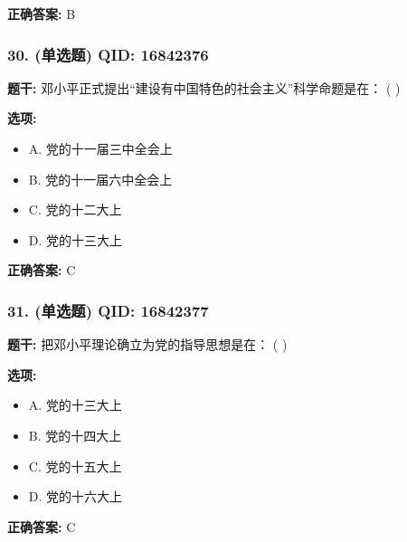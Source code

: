 \documentclass[12pt,UTF8]{ctexart}
\begin{document}
\textbf{正确答案:}
B

\vspace{0.3em}\hrulefill\vspace{0.7em}

\subsubsection*{30. (单选题) \small QID: 16842376}

\textbf{题干:}
邓小平正式提出“建设有中国特色的社会主义”科学命题是在： ( )

\textbf{选项:}
\begin{itemize}[leftmargin=*]

  \item A. 党的十一届三中全会上

  \item B. 党的十一届六中全会上

  \item C. 党的十二大上

  \item D. 党的十三大上

\end{itemize}

\textbf{正确答案:}
C

\vspace{0.3em}\hrulefill\vspace{0.7em}

\subsubsection*{31. (单选题) \small QID: 16842377}

\textbf{题干:}
把邓小平理论确立为党的指导思想是在： ( )

\textbf{选项:}
\begin{itemize}[leftmargin=*]

  \item A. 党的十三大上

  \item B. 党的十四大上

  \item C. 党的十五大上

  \item D. 党的十六大上

\end{itemize}

\textbf{正确答案:}
C

\vspace{0.3em}\hrulefill\vspace{0.7em}
\end{document}
